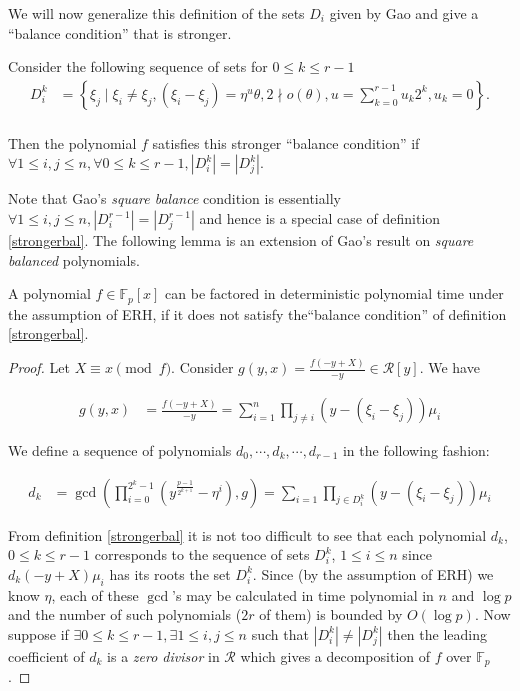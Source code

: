 We will now generalize this definition of the sets $D_i$ given by Gao and give a ``balance condition'' that is stronger.

\begin{definition}\label{strongerbal}
	Consider the following sequence of sets for $0 \le k \le r-1$
\begin{align*}
	D^k_i &= \left\{\xi_j \mid\xi_i \neq \xi_j,(\xi_i-\xi_j)=\eta^u 
	\theta,2\nmid o(\theta),u=\sum_{k=0}^{r-1}u_k2^k,u_{k}=0\right\}.\\
\end{align*}

Then the polynomial $f$ satisfies this stronger ``balance condition'' if $\forall 1 \le i,j \le n, \forall 0 \le k \le r-1, |D^k_i|=|D^k_j|$.
\end{definition}

Note that Gao's \emph{square balance} condition is essentially $\forall 1 \le i,j \le n,|D^{r-1}_i|=|D^{r-1}_j|$ and hence is a special case of definition \ref{strongerbal}. The following lemma is an extension of Gao's 
result on \emph{square balanced} polynomials.

\begin{lemma}\label{g}
	A polynomial $f \in \mathbb{F}_p[x]$ can be factored in deterministic polynomial time under the assumption of ERH, if it does not satisfy the``balance condition'' of definition \ref{strongerbal}.
   \end{lemma}


\begin{proof}
	Let $X \equiv x \pmod{f}$. Consider $g(y,x)=\frac{f(-y+X)}{-y} \in \mathcal{R}[y]$. We have

	\begin{align*}
		g(y,x) &= \frac{f(-y+X)}{-y} = \sum_{i=1}^n \prod_{j\neq i} (y-(\xi_i-\xi_j)) \mu_i
	\end{align*}

	We define a sequence of polynomials $d_0,\cdots,d_k,\cdots,d_{r-1}$ in the following fashion:

	\begin{align*}
	       d_k &= \gcd\left(\prod_{i=0}^{2^k-1} \left(y^{\frac{p-1}{2^{k+1}}}-
	       \eta^i\right),g\right) = 
	       \sum_{i=1}\prod_{j\in D^k_i}(y-(\xi_i-\xi_j))\mu_i
	     \end{align*}

	From definition \ref{strongerbal} it is not too difficult to see that each polynomial $d_k$, $0 \le k \le r-1$ corresponds to the sequence of sets $D^k_i$, $1 \le i \le n$ since $d_k(-y+X)\mu_i$ has its roots the
	set $D^k_i$. 
	     Since (by the assumption of ERH) we know $\eta$, each of these 
	     \(\gcd\)'s may be calculated in time polynomial in $n$ and
	     $\log{p}$ and the number of such polynomials ($2r$ of them) is bounded by $O(\log{p})$. Now suppose if $\exists 0 \le k \le r-1,\exists 1\le i,j \le n$ such that  $|D^k_i|\neq |D^k_j|$ then the leading coefficient
	     of $d_k$ is a \emph{zero divisor} in $\mathcal{R}$ which gives a decomposition of $f$ over $\mathbb{F}_p$.
\end{proof}

